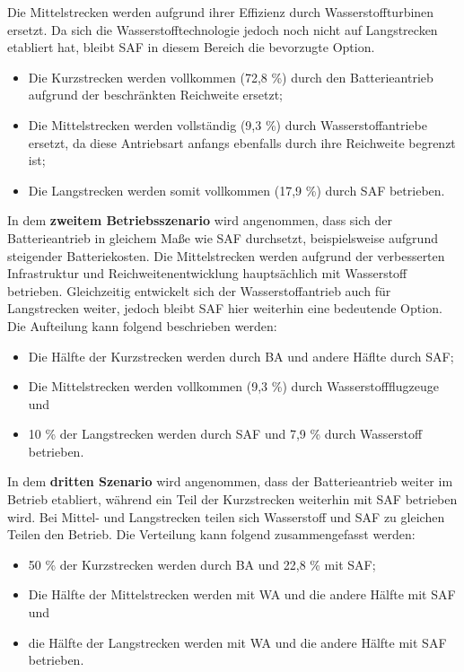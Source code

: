 Die Mittelstrecken werden aufgrund ihrer Effizienz durch Wasserstoffturbinen ersetzt. 
Da sich die Wasserstofftechnologie jedoch noch nicht auf Langstrecken etabliert hat, 
bleibt SAF in diesem Bereich die bevorzugte Option.
\begin{itemize}
    \item Die Kurzstrecken werden vollkommen (72,8 \%) durch den Batterieantrieb aufgrund der beschränkten Reichweite ersetzt;
    \item Die Mittelstrecken werden vollständig (9,3 \%) durch Wasserstoffantriebe ersetzt, 
	da diese Antriebsart anfangs ebenfalls durch ihre Reichweite begrenzt ist;
    \item Die Langstrecken werden somit vollkommen (17,9 \%) durch SAF betrieben.
\end{itemize}
%
In dem \textbf{zweitem Betriebsszenario} wird angenommen, dass sich der Batterieantrieb in gleichem Maße 
wie SAF durchsetzt, beispielsweise aufgrund steigender Batteriekosten. 
Die Mittelstrecken werden aufgrund der verbesserten Infrastruktur und 
Reichweitenentwicklung hauptsächlich mit Wasserstoff betrieben. 
Gleichzeitig entwickelt sich der Wasserstoffantrieb auch für Langstrecken weiter, 
jedoch bleibt SAF hier weiterhin eine bedeutende Option.
Die Aufteilung kann folgend beschrieben werden:
\begin{itemize}
    \item Die Hälfte der Kurzstrecken werden durch BA und andere Häflte durch SAF; 
    \item Die Mittelstrecken werden vollkommen (9,3 \%) durch Wasserstoffflugzeuge und
    \item 10 \% der Langstrecken werden durch SAF und 7,9 \% durch Wasserstoff betrieben.
\end{itemize}
In dem \textbf{dritten Szenario} wird angenommen, dass der Batterieantrieb weiter im Betrieb etabliert, 
während ein Teil der Kurzstrecken weiterhin mit SAF betrieben wird. Bei Mittel- 
und Langstrecken teilen sich Wasserstoff und SAF zu gleichen Teilen den Betrieb.
Die Verteilung kann folgend zusammengefasst werden:
\begin{itemize}
    \item 50 \% der Kurzstrecken werden durch BA und 22,8 \% mit SAF; 
    \item Die Hälfte der Mittelstrecken werden mit WA und die andere Hälfte mit SAF und 
    \item die Hälfte der Langstrecken werden mit WA und die andere Hälfte mit SAF betrieben. 
\end{itemize} %

